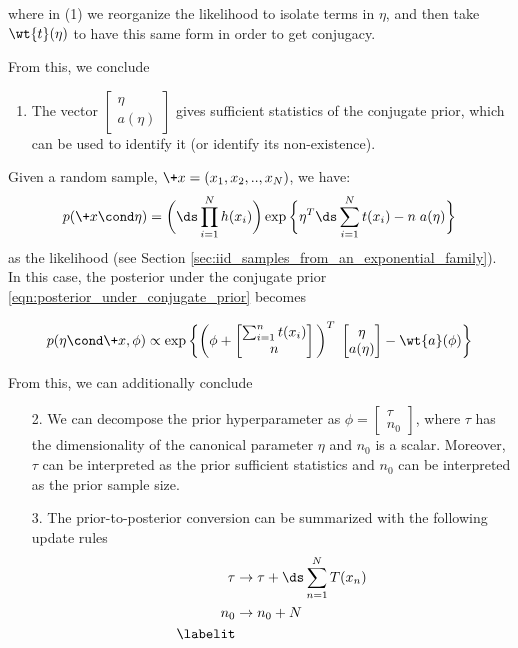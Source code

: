 \documentclass{article} %
\begin{document}
where in (1) we reorganize the likelihood to isolate terms in $\eta$, and then take $\wt{t}(\eta)$ to have this same form in order to get conjugacy.  

From this, we conclude
\begin{enumerate} 
\item The vector $\begin{bmatrix} 
\eta \\
a(\eta)
\end{bmatrix}$ gives sufficient statistics of the conjugate prior, which can be used to identify it (or identify its non-existence).	
\end{enumerate}


Given a random sample, $\+x=(x_1, x_2, .., x_N)$, we have:
\[ p(\+x \cond \eta) = \bigg( \ds\prod_{i=1}^N h(x_i)  \bigg) \exp \bigg\{ \eta^T  \ds\sum_{i=1}^N t(x_i) - n \; a(\eta) \bigg\} \]
as the likelihood (see Section \ref{sec:iid_samples_from_an_exponential_family}). In this case, the posterior under the conjugate prior \eqref{eqn:posterior_under_conjugate_prior} becomes

\begin{align*}
p(\eta \cond \+x, \phi) &\propto \exp \bigg\{ \bigg( \phi + \begin{bmatrix} 
\sum_{i=1}^n t(x_i) \\
n \\
\end{bmatrix} \bigg)^T \; \begin{bmatrix} 
\eta \\
a(\eta)
\end{bmatrix} - \wt{a}(\phi)  \bigg\} \\
\end{align*}


From this, we can additionally conclude
\begin{enumerate}
\item[2.] We can decompose the prior hyperparameter as $\phi = \begin{bmatrix} 
\tau \\
n_0
\end{bmatrix}$,   
where $\tau$ has the dimensionality of the canonical parameter $\eta$ and $n_0$ is a scalar.  Moreover, $\tau$ can be interpreted as the prior sufficient statistics and $n_0$ can be interpreted as the prior sample size.
\item[3.] The prior-to-posterior conversion can be summarized with the following update rules
\begin{align*}
\tau & \to \tau + \ds\sum_{n=1}^N T(x_n) \\
n_0 & \to  n_0 + N \\
\labelit \label{eqn:general_formalism_prior_to_posterior_conversion}
\end{align*}
\end{enumerate}
\end{document}
